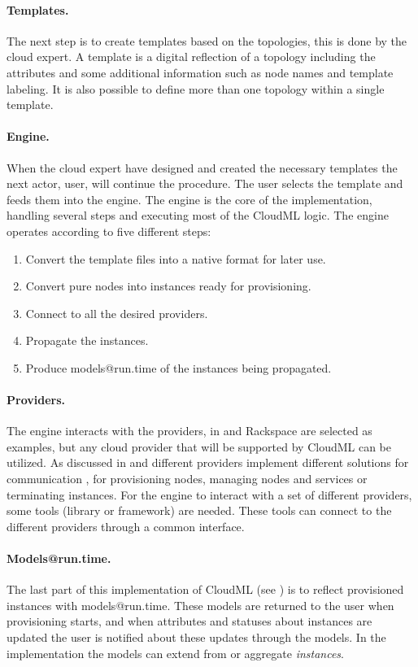 \paragraph{Templates.}

The next step is to create templates based on the topologies, this is done by
the cloud expert.
A template is a digital reflection of a topology including the attributes and some additional 
information such as node names and template labeling.
It is also possible to define more than one topology within a single template.

\paragraph{Engine.}

When the cloud expert have designed and created the necessary templates the next actor, 
user, will continue the procedure.
The user selects the template and feeds them into the engine.
The engine is the core of the implementation, handling several steps and executing
most of the CloudML logic.
The engine operates according to five different steps:
\begin{enumerate}
  \item Convert the template files into a native format for later use.
  \item Convert pure nodes into instances ready for provisioning.
  \item Connect to all the desired providers.
  \item Propagate the instances.
  \item Produce models@run.time of the instances being propagated.
\end{enumerate}

\paragraph{Providers.}

The engine interacts with the providers, in  
 and Rackspace are selected as examples, but any
cloud provider that will be supported by CloudML can be utilized.
As discussed in  and 
different providers implement different solutions for communication
\eg, for provisioning nodes, managing nodes and services or terminating instances.
For the engine to interact with a set of different providers, 
some tools (library or framework) are needed.
These tools can connect to the different providers through a common interface.

\paragraph{Models@run.time.}

The last part of this implementation of CloudML (see ) is to
reflect provisioned instances with models@run.time.
These models are returned to the user when provisioning starts, 
and when attributes and statuses about instances are updated the user is 
notified about these updates through the models.
In the implementation the models can extend from or aggregate \emph{instances}.
